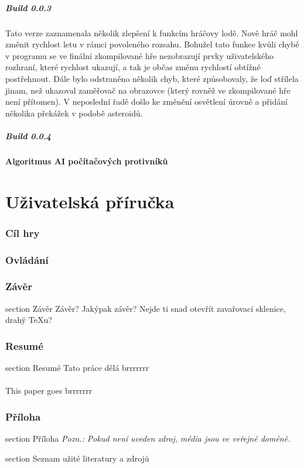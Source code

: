 \documentclass[12pt,a4paper,hidelinks]{article}
\begin{document}
\subsubsection{Build 0.0.3}
Tato verze zaznamenala několik zlepšení k funkcím hráčovy lodě. Nově hráč mohl změnit rychlost letu v rámci povoleného rozsahu. Bohužel tato funkce kvůli chybě v programu se ve finální zkompilované hře nezobrazují prvky uživatelského rozhraní, které rychlost ukazují, a tak je občas změnu rychlostí obtížné postřehnout. Dále bylo odstraněno několik chyb, které způsobovaly, že loď střílela jinam, než ukazoval zaměřovač na obrazovce (který rovněž ve zkompilované hře není přítomen). V neposlední řadě došlo ke změnění osvětlení úrovně a přidání několika překážek v podobě asteroidů.\\
\subsubsection{Build 0.0.4}

\subsection{Algoritmus AI počítačových protivníků}
\clearpage

\part{Uživatelská příručka}

\section{Cíl hry}

\section{Ovládání}

\clearpage
\section*{Závěr}
 {section} {Závěr}
Závěr? Jakýpak závěr? Nejde ti snad otevřít zavařovací sklenice, drahý TeXu?

\clearpage

\section*{Resumé}
 {section} {Resumé}
Tato práce dělá brrrrrrr\\
\\
This paper goes brrrrrrr\\


\clearpage

\section*{Příloha}
 {section} {Příloha}
\textit{Pozn.: Pokud není uveden zdroj, média jsou ve veřejné doméně.}
\clearpage


\printbibliography[title={Seznam literatury a zdrojů}]
 {section} {Seznam užité literatury a zdrojů}
\end{document}

